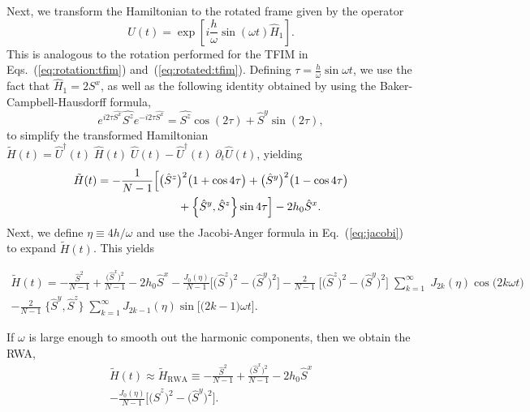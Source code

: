 \documentclass[%
reprint,
superscriptaddress,
amsmath,amssymb,
aps,
prb,
showkeys,
]{revtex4-2}
\begin{document}
Next, we transform the Hamiltonian to the rotated frame given by the operator
\begin{equation}
	\hat{U}(t)=\exp [i \frac{h}{\omega} \sin (\omega t) \hat{H}_{1}].
\end{equation}
This is analogous to the rotation performed for the TFIM in Eqs.~(\ref{eq:rotation:tfim}) and~(\ref{eq:rotated:tfim}). Defining $\tau = \displaystyle\frac{h}{\omega}\sin{\omega t}$, we use the fact that $\hat{H}_1 = 2 S^x$, as well as the following identity obtained by using the Baker-Campbell-Hausdorff formula,
\begin{equation}
	e^{i 2\tau\hat{S^{x}}} \hat{S^{z}} e^{-i 2\tau \hat{S^{x}}}=\hat{S^{z}} \cos \left(2\tau\right)+\hat{S}^{y} \sin (2\tau),
\end{equation}
to simplify the transformed Hamiltonian $\tilde{H}(t) = \hat{U}^\dagger(t)\;\hat{H}(t)\;\hat{U}(t) - \hat{U}^\dagger(t)\;\partial_t\hat{U}(t)$, yielding
\begin{align}
	\label{eq:lmg_rotated}
	\tilde{H}(t)& = -\frac{1}{N-1}\Big[\big(\hat{S}^z\big)^2 \big(1+\cos{4\tau}\big)+ \big(\hat{S}^y\big)^2 \big(1-\cos{4\tau}\big)\nonumber \\  
	&\hskip 2.5cm + \pb{\hat{S}^y}{\hat{S}^z}
	\sin{4\tau}\Big] - 2 h_0 \hat{S}^x.
\end{align}
Next, we define $\eta\equiv 4h/\omega$ and use the Jacobi-Anger formula in Eq.~(\ref{eq:jacobi})
to expand $\tilde{H}(t)$. This yields
\begin{widetext}
	\begin{multline}
		\label{eq:lmg_jacobiexp}
		\tilde{H}(t)= -\frac{\hat{S}^2}{N-1} +  \frac{\big(\hat{S}^x\big)^{2}}{N-1} - 2h_0 \hat{S}^x - \frac{J_0(\eta)}{N-1}\bigg[\big(\hat{S}^z\big)^{2} - \big(\hat{S}^y\big)^{2} \bigg] - \frac{2}{N-1}\;\Big[\big( \hat{S}^z\big)^2 - \big( \hat{S}^y\big)^2\Big]\;\sum^\infty_{k=1}\;J_{2k}(\eta)\cos{\big(2k\omega t\big)}\\
		- \frac{2}{N-1}\;\big\{ \hat{S}^y,  \hat{S}^z \big\}\;\sum^\infty_{k=1}J_{2k-1}(\eta)  \sin{\Big[\big(2k-1\big)\omega t\Big]}.
	\end{multline}
\end{widetext}
If $\omega$ is large enough to smooth out the harmonic components, then we obtain the RWA,
\begin{multline}
	\tilde{H}(t)\approx \tilde{H}_{\mathrm{RWA}}\equiv -\frac{\hat{S}^2}{N-1} +  \frac{\big(\hat{S}^x\big)^{2}}{N-1} - 2h_0 \hat{S}^x\\
	- \frac{J_0(\eta)}{N-1}\bigg[\big(\hat{S}^z\big)^{2} - \big(\hat{S}^y\big)^{2} \bigg].
	\label{eq:lmg_rwa}
\end{multline}
\end{document}
